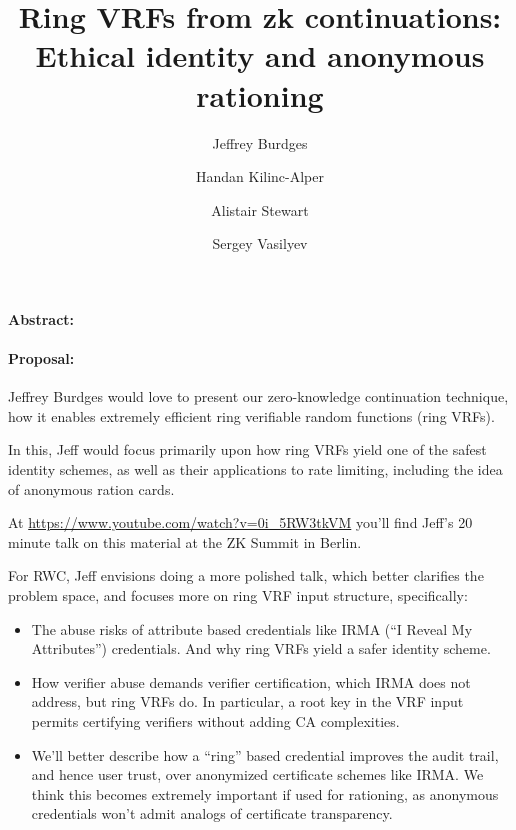 \documentclass{article}
\title{Ring VRFs from zk continuations: \\ Ethical identity and anonymous rationing}
\author{Jeffrey Burdges \and Handan Kilinc-Alper \and Alistair Stewart \and Sergey Vasilyev}
\date{}
\begin{document}
\maketitle


\paragraph{Abstract:} \quad 



\paragraph{Proposal:} \quad

Jeffrey Burdges would love to present our zero-knowledge continuation
technique, how it enables extremely efficient ring verifiable
random functions (ring VRFs).

In this, Jeff would focus primarily upon how ring VRFs yield one of the
safest identity schemes, as well as their applications to rate limiting,
including the idea of anonymous ration cards.

\smallskip

At \quad \url{https://www.youtube.com/watch?v=0i_5RW3tkVM} \quad you'll
find Jeff's 20 minute talk on this material at the
ZK Summit in Berlin.

\smallskip

For RWC, Jeff envisions doing a more polished talk, which better clarifies
the problem space, and focuses more on ring VRF input structure,
specifically:
\begin{itemize}
\item The abuse risks of attribute based credentials like
 IRMA (``I Reveal My Attributes'') credentials.
 And why ring VRFs yield a safer identity scheme.
\item How verifier abuse demands verifier certification, which IRMA does
 not address, but ring VRFs do.  In particular, a root key in the VRF input
 permits certifying verifiers without adding CA complexities.
\item We'll better describe how a ``ring'' based credential improves
 the audit trail, and hence user trust, over anonymized certificate schemes
 like IRMA.  We think this becomes extremely important if used for rationing,
 as anonymous credentials won't admit analogs of certificate transparency.
\end{itemize}
\end{document}
